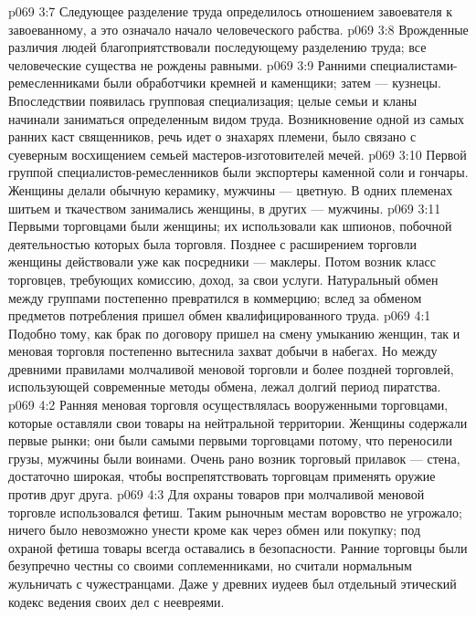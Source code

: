 \vs p069 3:7 \pc {}\bibnobreakspace {} Следующее разделение труда определилось отношением завоевателя к завоеванному, а это означало начало человеческого рабства.
\vs p069 3:8 \pc {}\bibnobreakspace {} Врожденные различия людей благоприятствовали последующему разделению труда; все человеческие существа не рождены равными.
\vs p069 3:9 Ранними специалистами\hyp{}ремесленниками были обработчики кремней и каменщики; затем --- кузнецы. Впоследствии появилась групповая специализация; целые семьи и кланы начинали заниматься определенным видом труда. Возникновение одной из самых ранних каст священников, речь идет о знахарях племени, было связано с суеверным восхищением семьей мастеров\hyp{}изготовителей мечей.
\vs p069 3:10 \pc Первой группой специалистов\hyp{}ремесленников были экспортеры каменной соли и гончары. Женщины делали обычную керамику, мужчины --- цветную. В одних племенах шитьем и ткачеством занимались женщины, в других --- мужчины.
\vs p069 3:11 Первыми торговцами были женщины; их использовали как шпионов, побочной деятельностью которых была торговля. Позднее с расширением торговли женщины действовали уже как посредники --- маклеры. Потом возник класс торговцев, требующих комиссию, доход, за свои услуги. Натуральный обмен между группами постепенно превратился в коммерцию; вслед за обменом предметов потребления пришел обмен квалифицированного труда.
\vs p069 4:1 Подобно тому, как брак по договору пришел на смену умыканию женщин, так и меновая торговля постепенно вытеснила захват добычи в набегах. Но между древними правилами молчаливой меновой торговли и более поздней торговлей, использующей современные методы обмена, лежал долгий период пиратства.
\vs p069 4:2 Ранняя меновая торговля осуществлялась вооруженными торговцами, которые оставляли свои товары на нейтральной территории. Женщины содержали первые рынки; они были самыми первыми торговцами потому, что переносили грузы, мужчины были воинами. Очень рано возник торговый прилавок --- стена, достаточно широкая, чтобы воспрепятствовать торговцам применять оружие против друг друга.
\vs p069 4:3 Для охраны товаров при молчаливой меновой торговле использовался фетиш. Таким рыночным местам воровство не угрожало; ничего было невозможно унести кроме как через обмен или покупку; под охраной фетиша товары всегда оставались в безопасности. Ранние торговцы были безупречно честны со своими соплеменниками, но считали нормальным жульничать с чужестранцами. Даже у древних иудеев был отдельный этический кодекс ведения своих дел с неевреями.
